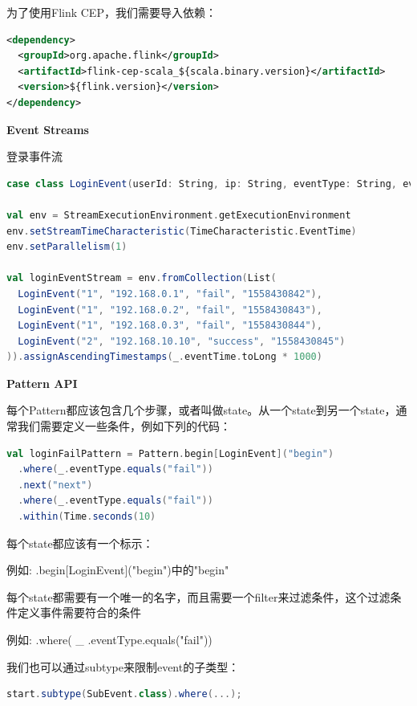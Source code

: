 \documentclass[oneside]{ctexbook}
\begin{document}
为了使用Flink CEP，我们需要导入依赖：

\begin{lstlisting}[language=xml]
<dependency>
  <groupId>org.apache.flink</groupId>
  <artifactId>flink-cep-scala_${scala.binary.version}</artifactId>
  <version>${flink.version}</version>
</dependency>
\end{lstlisting}

\textbf{Event Streams}

登录事件流

\begin{lstlisting}[language=scala]
case class LoginEvent(userId: String, ip: String, eventType: String, eventTime: String)

val env = StreamExecutionEnvironment.getExecutionEnvironment
env.setStreamTimeCharacteristic(TimeCharacteristic.EventTime)
env.setParallelism(1)

val loginEventStream = env.fromCollection(List(
  LoginEvent("1", "192.168.0.1", "fail", "1558430842"),
  LoginEvent("1", "192.168.0.2", "fail", "1558430843"),
  LoginEvent("1", "192.168.0.3", "fail", "1558430844"),
  LoginEvent("2", "192.168.10.10", "success", "1558430845")
)).assignAscendingTimestamps(_.eventTime.toLong * 1000)
\end{lstlisting}

\textbf{Pattern API}

每个Pattern都应该包含几个步骤，或者叫做state。从一个state到另一个state，通常我们需要定义一些条件，例如下列的代码：

\begin{lstlisting}[language=scala]
val loginFailPattern = Pattern.begin[LoginEvent]("begin")
  .where(_.eventType.equals("fail"))
  .next("next")
  .where(_.eventType.equals("fail"))
  .within(Time.seconds(10)
\end{lstlisting}

每个state都应该有一个标示：

例如: .begin[LoginEvent]("begin")中的"begin"

每个state都需要有一个唯一的名字，而且需要一个filter来过滤条件，这个过滤条件定义事件需要符合的条件

例如: \colorbox{gray!20}{.where( \_ .eventType.equals("fail"))}

我们也可以通过subtype来限制event的子类型：

\begin{lstlisting}[language=scala]
start.subtype(SubEvent.class).where(...);
\end{lstlisting}
\end{document}
